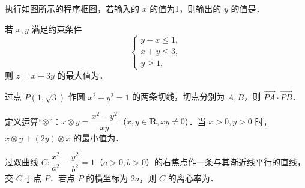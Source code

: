 \Needspace{0.4\textheight}
\begin{question}
执行如图所示的程序框图，若输入的 \(x\) 的值为1，则输出的 \(y\) 的值是\gkblank{}．
\nopagebreak[4]
\begin{center}\end{center}
\nopagebreak[4]
\end{question}
\begin{question}
若 \(x,y\) 满足约束条件
\nopagebreak[4]
\[
\begin{cases}y-x\leqslant1,\\x+y\leqslant3,\\y\geqslant1,\end{cases}
\]
则 \(z=x+3y\) 的最大值为\gkblank{}．

\end{question}
\begin{question}
过点 \(P(1,\sqrt3)\) 作圆 \(x^2+y^2=1\) 的两条切线，切点分别为 \(A,B\)，则 \(\overrightarrow{PA}\cdot\overrightarrow{PB}\)\gkblank{}．

\end{question}
\begin{question}
定义运算“\(\otimes\)”：\(x\otimes y=\dfrac{x^2-y^2}{xy}\)（\(x,y\in\mathbf{R},xy\ne0\)）．当 \(x>0,y>0\) 时，\(x\otimes y+(2y)\otimes x\) 的最小值为\gkblank{}．

\end{question}
\begin{question}
过双曲线 \(C:\dfrac{x^2}{a^2}-\dfrac{y^2}{b^2}=1\)（\(a>0,b>0\)）的右焦点作一条与其渐近线平行的直线，交 \(C\) 于点 \(P\)．若点 \(P\) 的横坐标为 \(2a\)，则 \(C\) 的离心率为\gkblank{}．

\end{question}

